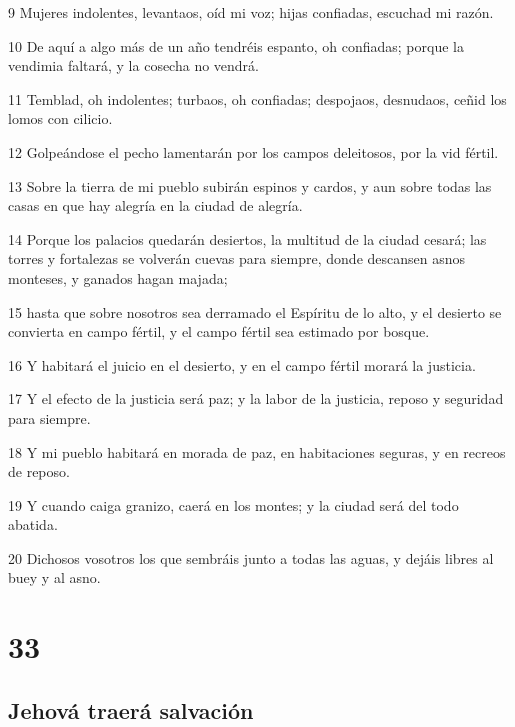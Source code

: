 \par 9 Mujeres indolentes, levantaos, oíd mi voz; hijas confiadas, escuchad mi razón.
\par 10 De aquí a algo más de un año tendréis espanto, oh confiadas; porque la vendimia faltará, y la cosecha no vendrá.
\par 11 Temblad, oh indolentes; turbaos, oh confiadas; despojaos, desnudaos, ceñid los lomos con cilicio.
\par 12 Golpeándose el pecho lamentarán por los campos deleitosos, por la vid fértil.
\par 13 Sobre la tierra de mi pueblo subirán espinos y cardos, y aun sobre todas las casas en que hay alegría en la ciudad de alegría.
\par 14 Porque los palacios quedarán desiertos, la multitud de la ciudad cesará; las torres y fortalezas se volverán cuevas para siempre, donde descansen asnos monteses, y ganados hagan majada;
\par 15 hasta que sobre nosotros sea derramado el Espíritu de lo alto, y el desierto se convierta en campo fértil, y el campo fértil sea estimado por bosque.
\par 16 Y habitará el juicio en el desierto, y en el campo fértil morará la justicia.
\par 17 Y el efecto de la justicia será paz; y la labor de la justicia, reposo y seguridad para siempre.
\par 18 Y mi pueblo habitará en morada de paz, en habitaciones seguras, y en recreos de reposo.
\par 19 Y cuando caiga granizo, caerá en los montes; y la ciudad será del todo abatida.
\par 20 Dichosos vosotros los que sembráis junto a todas las aguas, y dejáis libres al buey y al asno.

\chapter{33}

\section*{Jehová traerá salvación}

